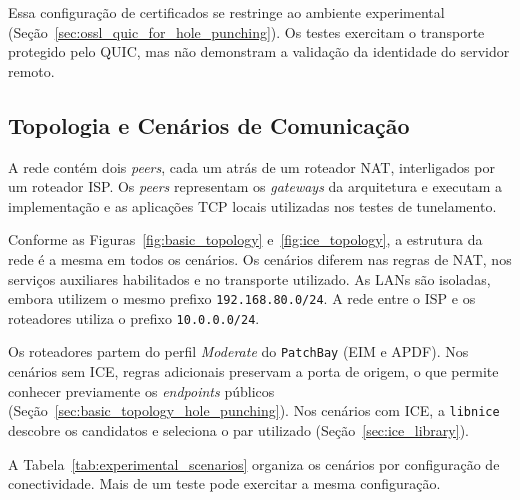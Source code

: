 Essa configuração de certificados se restringe ao ambiente experimental (Seção~\ref{sec:ossl_quic_for_hole_punching}). Os testes exercitam o transporte protegido pelo QUIC, mas não demonstram a validação da identidade do servidor remoto.

\subsection{Topologia e Cenários de Comunicação}
\label{sec:experimental_scenarios}

A rede contém dois \textit{peers}, cada um atrás de um roteador NAT, interligados por um roteador ISP. Os \textit{peers} representam os \textit{gateways} da arquitetura e executam a implementação e as aplicações TCP locais utilizadas nos testes de tunelamento.

Conforme as Figuras~\ref{fig:basic_topology} e~\ref{fig:ice_topology}, a estrutura da rede é a mesma em todos os cenários. Os cenários diferem nas regras de NAT, nos serviços auxiliares habilitados e no transporte utilizado. As LANs são isoladas, embora utilizem o mesmo prefixo \texttt{192.168.80.0/24}. A rede entre o ISP e os roteadores utiliza o prefixo \texttt{10.0.0.0/24}.

Os roteadores partem do perfil \textit{Moderate} do \texttt{PatchBay} (EIM e APDF). Nos cenários sem ICE, regras adicionais preservam a porta de origem, o que permite conhecer previamente os \textit{endpoints} públicos (Seção~\ref{sec:basic_topology_hole_punching}). Nos cenários com ICE, a \texttt{libnice} descobre os candidatos e seleciona o par utilizado (Seção~\ref{sec:ice_library}).

A Tabela~\ref{tab:experimental_scenarios} organiza os cenários por configuração de conectividade. Mais de um teste pode exercitar a mesma configuração.

